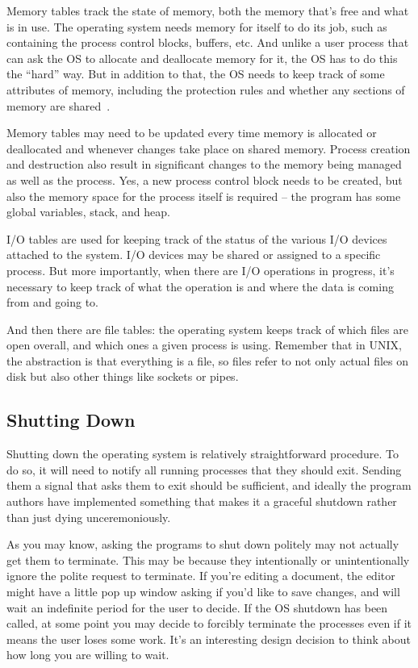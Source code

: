 Memory tables track the state of memory, both the memory that's free and what is in use. The operating system needs memory for itself to do its job, such as containing the process control blocks, buffers, etc. And unlike a user process that can ask the OS to allocate and deallocate memory for it, the OS has to do this the ``hard'' way. But in addition to that, the OS needs to keep track of some attributes of memory, including the protection rules and whether any sections of memory are shared~\cite{osi}. 

Memory tables may need to be updated every time memory is allocated or deallocated and whenever changes take place on shared memory. Process creation and destruction also result in significant changes to the memory being managed as well as the process. Yes, a new process control block needs to be created, but also the memory space for the process itself is required -- the program has some global variables, stack, and heap.

I/O tables are used for keeping track of the status of the various I/O devices attached to the system. I/O devices may be shared or assigned to a specific process. But more importantly, when there are I/O operations in progress, it's necessary to keep track of what the operation is and where the data is coming from and going to. 

And then there are file tables: the operating system keeps track of which files are open overall, and which ones a given process is using. Remember that in UNIX, the abstraction is that everything is a file, so files refer to not only actual files on disk but also other things like sockets or pipes.


\subsection*{Shutting Down}
Shutting down the operating system is relatively straightforward procedure. To do so, it will need to notify all running processes that they should exit. Sending them a signal that asks them to exit should be sufficient, and ideally the program authors have implemented something that makes it a graceful shutdown rather than just dying unceremoniously. 

As you may know, asking the programs to shut down politely may not actually get them to terminate. This may be because they intentionally or unintentionally ignore the polite request to terminate. If you're editing a document, the editor might have a little pop up window asking if you'd like to save changes, and will wait an indefinite period for the user to decide. If the OS shutdown has been called, at some point you may decide to forcibly terminate the processes even if it means the user loses some work. It's an interesting design decision to think about how long you are willing to wait. 

